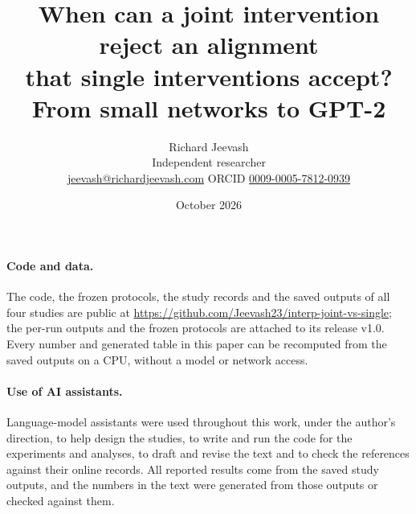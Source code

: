 \documentclass[11pt]{article}
\title{\textbf{When can a joint intervention reject an alignment\\ that single interventions accept?\\ From small networks to GPT-2}}
\author{Richard Jeevash\\[2pt]
\small Independent researcher\\
\small \href{mailto:jeevash@richardjeevash.com}{jeevash@richardjeevash.com}\quad
ORCID \href{https://orcid.org/0009-0005-7812-0939}{0009-0005-7812-0939}}
\date{\vspace{-0.5em}October 2026}
\theoremstyle{remark}
\newcommand{\coderepo}{\url{https://github.com/Jeevash23/interp-joint-vs-single}}
\begin{document}
\maketitle
\vspace{-2em}

\begin{abstract}
\noindent

\end{abstract}












\paragraph{Code and data.}
The code, the frozen protocols, the study records and the saved outputs of all four studies are public at
\coderepo{}; the per-run outputs and the frozen protocols are attached to its release v1.0. Every number and generated
table in this paper can be recomputed from the saved outputs on a CPU, without a model or network access.

\paragraph{Use of AI assistants.}
Language-model assistants were used throughout this work, under the author's direction, to help design the studies, to write and run the code for the experiments and analyses, to draft and revise the text and to check the references against their online records. All reported results come from the saved study outputs, and the numbers in the text were generated from those outputs or checked against them.

\FloatBarrier



\clearpage
\appendix
{}

\end{document}
